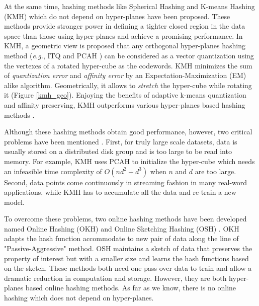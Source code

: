 \documentclass{article}
\begin{document}
At the same time, hashing methods like Spherical Hashing \cite{heo2012spherical} and K-means Hashing (KMH) \cite{he2013k} which do not depend on hyper-planes have been proposed.
These methods provide stronger power in defining a tighter closed region in the  data space \cite{heo2012spherical} than those using hyper-planes and achieve a promising  performance.
In KMH, a geometric view is proposed that any orthogonal hyper-planes hashing
method (\emph{e.g.}, ITQ and PCAH \cite{gong2013iterative}) can be considered as a vector quantization  using the vertexes of a rotated hyper-cube as the codewords.
KMH minimizes the sum of \emph{quantization error} and \emph{affinity error} by an Expectation-Maximization (EM) alike algorithm. Geometrically, it allows to \emph{stretch} the hyper-cube while rotating it (Figure \ref{kmh_geo}). Enjoying the benefits of adaptive k-means quantization and affinity preserving, KMH outperforms various hyper-planes based hashing methods \cite{he2013k}.

Although these hashing methods obtain good performance, however, two critical problems have been mentioned \cite{huang2013online}. First, for truly large scale datasets, data is usually stored on a distributed disk group and is too large to be read into memory. For example, KMH uses PCAH to initialize the hyper-cube which needs an infeasible time complexity of $O(nd^{2} + d^{3})$ when $n$ and $d$ are too large. Second, data points come continuously in streaming fashion in many real-word applications, while KMH has to accumulate all the data and re-train a new model.

To overcome these problems, two online hashing methods have been developed  named Online Hashing (OKH) \cite{huang2013online} and Online Sketching Hashing (OSH) \cite{leng2015online}. OKH adapts the hash function accommodate to new pair of data along the line of "Passive-Aggressive" method. OSH maintains a sketch of data that preserves the property of interest but with a smaller size and learns the hash functions based on the sketch. These methods both need one pass over data to train and allow a dramatic reduction in computation and storage. However, they are both hyper-planes based online hashing methods. As far as we know, there is no online hashing which does not depend on hyper-planes.
\end{document}

